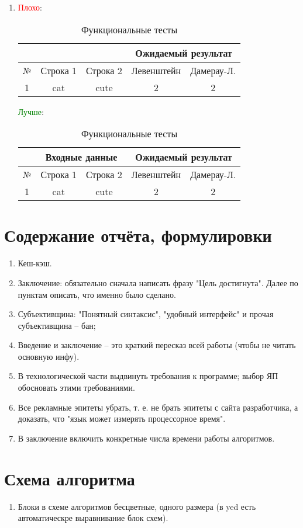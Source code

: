 \begin{enumerate}
	\item \textcolor{red}{Плохо}:
	\begin{table}[h!]
		\begin{center}
			\caption{\label{ft} Функциональные тесты}
			\begin{tabular}{|c|c|c|c|c|}
				\hline
				& & & \multicolumn{2}{c|}{Ожидаемый результат} \\
				\hline
				№&Строка 1&Строка 2&Левенштейн&Дамерау-Л. \\
				\hline
				1&cat&cute&2&2 \\
				\hline
			\end{tabular}
		\end{center}
	\end{table}
	\newline
	\textcolor{green}{Лучше}:
	\begin{table}[h!]
		\begin{center}
			\caption{\label{ft} Функциональные тесты}
			\begin{tabular}{|c|c|c|c|c|}
				\hline
				& \multicolumn{2}{c|}{Входные данные} & \multicolumn{2}{c|}{Ожидаемый результат} \\
				\hline
				№&Строка 1&Строка 2&Левенштейн&Дамерау-Л. \\
				\hline
				1&cat&cute&2&2 \\
				\hline
			\end{tabular}
		\end{center}
	\end{table}
\end{enumerate}

\clearpage
\section{Содержание отчёта, формулировки}
\begin{enumerate}
	\item Кеш-кэш.
	\item Заключение: обязательно сначала написать фразу "Цель достигнута". Далее по пунктам описать, что именно было сделано.
	\item Субъективщина: "Понятный синтаксис", "удобный интерфейс" и прочая субъективщина -- бан;
	\item Введение и заключение -- это краткий пересказ всей работы (чтобы не читать основную инфу).
	\item В технологической части выдвинуть требования к программе; выбор ЯП обосновать этими требованиями.
	\item Все рекламные эпитеты убрать, т. е. не брать эпитеты с сайта разработчика, а доказать, что "язык может измерять процессорное время".
	\item В заключение включить конкретные числа времени работы алгоритмов.
\end{enumerate}

\section{Схема алгоритма}
\begin{enumerate}
	\item Блоки в схеме алгоритмов бесцветные, одного размера (в yed есть автоматическре выравнивание блок схем).
\end{enumerate}










